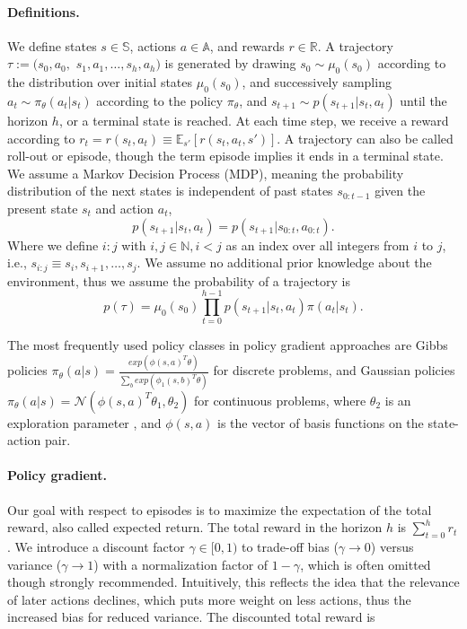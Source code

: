 \paragraph{Definitions.} 
We define states $s \in \mathbb{S}$, actions $a \in \mathbb{A}$, and rewards $r \in \mathbb{R}$. 
A trajectory $\tau := (s_0, a_0, $ $s_1, a_1, \dots, s_h, a_h)$ is generated by drawing $s_0 \sim \mu_0(s_0)$ according to the distribution over initial states $\mu_0(s_0)$, and successively sampling $a_t \sim \pi_\theta(a_t|s_t)$ according to the policy $\pi_\theta$, and $s_{t+1} \sim p(s_{t+1}|s_t,a_t)$ until the horizon $h$, or a terminal state is reached. 
At each time step, we receive a reward according to $r_t = r(s_t, a_t) \equiv \mathbb{E}_{s'}\left[r(s_t,a_t,s')\right]$. 
A trajectory can also be called roll-out or episode, though the term episode implies it ends in a terminal state.
We assume a Markov Decision Process (MDP), meaning the probability distribution of the next states is independent of past states $s_{0:t-1}$ given the present state $s_t$ and action $a_t$, 
\begin{equation}
	p(s_{t+1}|s_t,a_t)=p(s_{t+1}|s_{0:t},a_{0:t}).
\end{equation}
Where we define $i:j$ with $i,j \in \mathbb{N}, i < j$ as an index over all integers from $i$ to $j$, i.e., $s_{i:j} \equiv s_i, s_{i+1}, \dots, s_j$. 
We assume no additional prior knowledge about the environment, thus we assume the probability of a trajectory is 
\begin{equation}
	p(\tau) = \mu_0(s_0) \prod_{t=0}^{h-1} p(s_{t+1}|s_{t}, a_{t}) \pi(a_t|s_{t}).
\end{equation}

The most frequently used policy classes in policy gradient approaches are Gibbs policies $\pi_\theta(a|s) = \frac{exp(\phi(s,a)^T\theta)}{\sum_b exp(\phi_1(s,b)^T\theta)}$ \cite{Sutton:1999:PGM:3009657.3009806,Bagnell2004LearningD} for discrete problems, and Gaussian policies $\pi_\theta(a|s) = \mathcal{N}(\phi(s,a)^T\theta_1,\theta_2)$ for continuous problems, where $\theta_2$ is an exploration parameter \cite{Williams92simplestatistical,peter:article:1996}, and $\phi(s,a)$ is the vector of basis functions on the state-action pair.

\paragraph{Policy gradient.} 
Our goal with respect to episodes is to maximize the expectation of the total reward, also called expected return. 
The total reward in the horizon $h$ is $\sum_{t=0}^{h} r_{t}$. 
We introduce a discount factor $\gamma \in [0,1)$ to trade-off bias ($\gamma\to0$) versus variance ($\gamma\to1$) with a normalization factor of $1-\gamma$, which is often omitted though strongly recommended.
Intuitively, this reflects the idea that the relevance of later actions declines, which puts more weight on less actions, thus the increased bias for reduced variance. 
The discounted total reward is 

